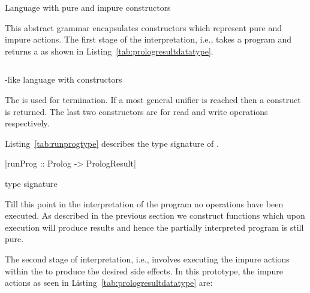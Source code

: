 \documentclass[thesis-solanki.tex]{subfiles}
\begin{document}
\begin{code-list}[H]
\begin{singlespace}
\inputminted{haskell}{haskell-proto4-prlg-lang.hs}
\end{singlespace}
\caption{Language with pure and impure constructors}
\label{tab:langwithpureandimpureconstructors}
\end{code-list}

This abstract grammar encapsulates constructors which represent pure and impure actions. The first stage of the interpretation, i.e., 
 takes a program and returns a  as shown in Listing~\ref{tab:prologresultdatatype}.

\begin{code-list}[H]
\begin{singlespace}
  \inputminted[linenos, firstline=7, lastline=11]{haskell}{haskell-proto4-platen-winkel.hs}
\end{singlespace}
\caption{-like language with  constructors}
\label{tab:prologresultdatatype}
\end{code-list}

The  is used for termination. If a most general unifier is reached then a  construct is
returned. The last two constructors are for read and write operations respectively.

Listing~\ref{tab:runprogtype} describes the type signature of .
\begin{code-list}[H]
\begin{singlespace}
|runProg :: Prolog -> PrologResult| 
\end{singlespace}
\caption{ type signature}
\label{tab:runprogtype}
\end{code-list}

Till this point in the interpretation of the program no  operations have been executed. As described in the previous 
section we construct functions which upon execution will produce results and hence the partially interpreted program is still pure.

The second stage of interpretation, i.e.,  involves executing the impure actions within the  to produce the desired side
effects. In this prototype, the impure actions as seen in Listing~\ref{tab:prologresultdatatype} are:
\end{document}

